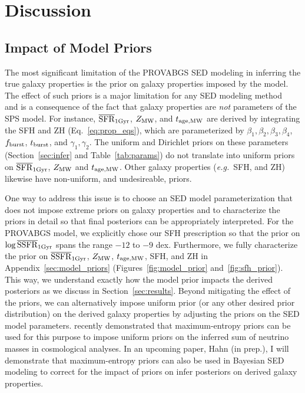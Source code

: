 \section{Discussion} \label{sec:discuss}
\subsection{Impact of Model Priors}
The most significant limitation of the {\sc PROVABGS} SED modeling in
inferring the true galaxy properties is the prior on galaxy properties imposed
by the model. 
The effect of such priors is a major limitation for any SED modeling
method~\citep[\emph{e.g.}][]{carnall2019a, leja2019} and is a consequence of
the fact that galaxy properties are \emph{not} parameters of the SPS model.
For instance, $\overline{\rm SFR}_{\rm 1Gyr}$, $Z_{\rm MW}$, and $t_{\rm age, MW}$ are derived by integrating the SFH
and ZH (Eq.~\ref{eq:prop_eqs}), which are parameterized by $\beta_1, \beta_2,
\beta_3, \beta_4$, $f_{\rm burst}$, $t_{\rm burst}$, and $\gamma_1, \gamma_2$. 
The uniform and Dirichlet priors on these parameters (Section~\ref{sec:infer}
and Table~\ref{tab:params}) do not translate into uniform priors on $\overline{\rm SFR}_{\rm 1Gyr}$,
$Z_{\rm MW}$ and $t_{\rm age, MW}$.
Other galaxy properties (\emph{e.g.}~SFH, and ZH) likewise have
non-uniform, and undesireable, priors. 

One way to address this issue is to choose an SED model parameterization that
does not impose extreme priors on galaxy properties and to characterize the
priors in detail so that final posteriors can be appropriately interpreted. 
For the {\sc PROVABGS} model, we explicitly chose our SFH prescription so that
the prior on $\log\overline{\rm SSFR}_{\rm 1Gyr}$ spans the range $-12$ to $-9$ dex.
Furthermore, we fully characterize the prior on $\overline{\rm SSFR}_{\rm 1Gyr}$, $Z_{\rm MW}$, $t_{\rm age, MW}$,
SFH, and ZH in Appendix~\ref{sec:model_priors} (Figures~\ref{fig:model_prior}
and~\ref{fig:sfh_prior}). 
This way, we understand exactly how the model prior impacts the derived
posteriors as we discuss in Section~\ref{sec:results}. 
Beyond mitigating the effect of the priors, we can alternatively impose uniform
prior (or any other desired prior distribution) on the derived galaxy
properties by adjusting the priors on the SED model parameters. 
\cite{handley2019} recently demonstrated that maximum-entropy priors can be
used for this purpose to impose uniform priors on the inferred sum of neutrino
masses in cosmological analyses. 
In an upcoming paper, Hahn (in prep.), I will demonstrate that maximum-entropy
priors can also be used in Bayesian SED modeling to correct for the impact of
priors on infer posteriors on derived galaxy properties. 


